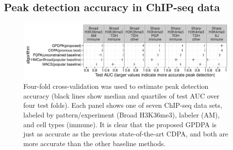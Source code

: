 \documentclass[aoas]{imsart}
\newcommand{\url}[1]{#1}
\begin{document}



\subsection{Peak detection accuracy in ChIP-seq data}


\begin{figure}[t!]
  \centering 
  \includegraphics[width=\textwidth]{figure-test-error-dots}
  \vskip -0.5cm
  \caption{Four-fold cross-validation was used to estimate peak
    detection accuracy (black lines show median and quartiles of test
    AUC over four test folds). Each panel shows one of seven ChIP-seq data
    sets, labeled by pattern/experiment (Broad H3K36me3), labeler
    (AM), and cell types (immune).  It is clear that the proposed
    GPDPA is just as accurate as the previous state-of-the-art CDPA,
    and both are more accurate than the other baseline methods.
  }
  \label{fig:test-error-dots}
\end{figure}
\end{document}

